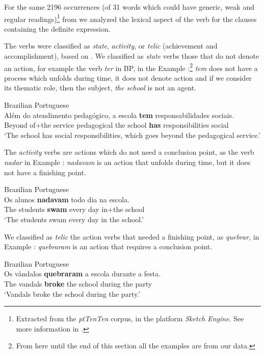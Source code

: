 \documentclass[output=paper,
modfonts
]{langscibook}
\begin{document}
For the same 2196 occurrences (of 31 words which could have generic, weak and regular readings)\footnote{Extracted from the \textit{ptTenTen} corpus, in the platform \textit{Sketch Engine}. See more information in \citet{deSaEtAlii2016}.} from \citet{deSaEtAlii2016} we analyzed the lexical aspect of the verb for the clauses containing the definite expression.

The verbs were classified as \textit{state}, \textit{activity}, or \textit{telic} (achievement and accomplishment), based on \citet{Vendler1957}. We classified as \textit{state} verbs those that do not denote an action, for example the verb \textit{ter} in BP, in the Example :\footnote{From here until the end of this section all the examples are from our data.} \textit{tem} does not have a process which unfolds during time, it does not denote action and if we consider its thematic role, then the subject, \textit{the school} is not an agent. 

\ea \label{ex:desaetal:4}
Brazilian Portuguese\\
\gll Além do atendimento pedagógico, a escola \textbf{tem} responsabilidades sociais. \\
Beyond {of+the} service pedagogical the school \textbf{has} responsibilities social\\  
\glt ‘The school has social responsibilities, which goes beyond the pedagogical service.’
\z

The \textit{activity} verbs are actions which do not need a conclusion point, as the verb \textit{nadar} in Example : \textit{nadavam} is an action that unfolds during time, but it does not have a finishing point.

\ea \label{ex:desaetal:5}
Brazilian Portuguese\\
\gll Os alunos \textbf{nadavam} todo dia na escola.\\
The students \textbf{swam} every day in+the school\\
\glt  `The students swam every day in the school.'
\z

We classified as \textit{telic} the action verbs that needed a finishing point, as \textit{quebrar}, in Example : \textit{quebraram} is an action that requires a conclusion point.

\ea \label{ex:desaetal:6}
Brazilian Portuguese\\
\gll Os vândalos \textbf{quebraram} a escola durante a festa.\\
The vandals \textbf{broke} the school during the party\\
\glt `Vandals broke the school during the party.'
\z
\end{document}
